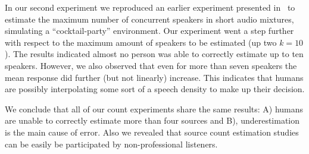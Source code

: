 \par
In our second experiment we reproduced an earlier experiment presented in~\cite{kawashima15} to estimate the maximum number of concurrent speakers in short audio mixtures, simulating a ``cocktail-party'' environment.
Our experiment went a step further with respect to the maximum amount of speakers to be estimated (up two \(k=10\)).
The results indicated almost no person was able to correctly estimate up to ten speakers.
However, we also observed that even for more than seven speakers the mean response did further (but not linearly) increase.
This indicates that humans are possibly interpolating some sort of a speech density to make up their decision.
\par
We conclude that all of our count experiments share the same results: A) humans are unable to correctly estimate more than four sources and B), underestimation is the main cause of error.
Also we revealed that source count estimation studies can be easily be participated by non-professional listeners.

